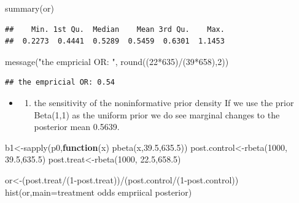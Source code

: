 \documentclass[
]{book}
\newenvironment{Shaded}{\begin{snugshade}}{\end{snugshade}}
\newcommand{\AttributeTok}[1]{\textcolor[rgb]{0.77,0.63,0.00}{#1}}
\newcommand{\ControlFlowTok}[1]{\textcolor[rgb]{0.13,0.29,0.53}{\textbf{#1}}}
\newcommand{\DecValTok}[1]{\textcolor[rgb]{0.00,0.00,0.81}{#1}}
\newcommand{\FloatTok}[1]{\textcolor[rgb]{0.00,0.00,0.81}{#1}}
\newcommand{\FunctionTok}[1]{\textcolor[rgb]{0.00,0.00,0.00}{#1}}
\newcommand{\NormalTok}[1]{#1}
\newcommand{\OtherTok}[1]{\textcolor[rgb]{0.56,0.35,0.01}{#1}}
\newcommand{\SpecialCharTok}[1]{\textcolor[rgb]{0.00,0.00,0.00}{#1}}
\newcommand{\StringTok}[1]{\textcolor[rgb]{0.31,0.60,0.02}{#1}}
\providecommand{\tightlist}{%
  \setlength{\itemsep}{0pt}\setlength{\parskip}{0pt}}
\theoremstyle{definition}
\theoremstyle{definition}
\theoremstyle{definition}
\theoremstyle{definition}
\theoremstyle{remark}
\begin{document}
\begin{Shaded}
\begin{Highlighting}[]
  \FunctionTok{summary}\NormalTok{(or)}
\end{Highlighting}
\end{Shaded}

\begin{verbatim}
##    Min. 1st Qu.  Median    Mean 3rd Qu.    Max. 
##  0.2273  0.4441  0.5289  0.5459  0.6301  1.1453
\end{verbatim}

\begin{Shaded}
\begin{Highlighting}[]
  \FunctionTok{message}\NormalTok{(}\StringTok{"the empricial OR: "}\NormalTok{, }\FunctionTok{round}\NormalTok{((}\DecValTok{22}\SpecialCharTok{*}\DecValTok{635}\NormalTok{)}\SpecialCharTok{/}\NormalTok{(}\DecValTok{39}\SpecialCharTok{*}\DecValTok{658}\NormalTok{),}\DecValTok{2}\NormalTok{))}
\end{Highlighting}
\end{Shaded}

\begin{verbatim}
## the empricial OR: 0.54
\end{verbatim}

\begin{itemize}
\item
  \begin{enumerate}
  \def\labelenumi{(\alph{enumi})}
  \setcounter{enumi}{2}
  \tightlist
  \item
    the sensitivity of the noninformative prior density
    If we use the prior Beta(1,1) as the uniform prior we do see marginal changes to the posterior mean 0.5639.
  \end{enumerate}
\end{itemize}

\begin{Shaded}
\begin{Highlighting}[]
\NormalTok{b1}\OtherTok{\textless{}{-}}\FunctionTok{sapply}\NormalTok{(p0,}\ControlFlowTok{function}\NormalTok{(x) }\FunctionTok{pbeta}\NormalTok{(x,}\FloatTok{39.5}\NormalTok{,}\FloatTok{635.5}\NormalTok{))}
\NormalTok{ post.control}\OtherTok{\textless{}{-}}\FunctionTok{rbeta}\NormalTok{(}\DecValTok{1000}\NormalTok{, }\FloatTok{39.5}\NormalTok{,}\FloatTok{635.5}\NormalTok{)}
\NormalTok{  post.treat}\OtherTok{\textless{}{-}}\FunctionTok{rbeta}\NormalTok{(}\DecValTok{1000}\NormalTok{, }\FloatTok{22.5}\NormalTok{,}\FloatTok{658.5}\NormalTok{)}

\NormalTok{  or}\OtherTok{\textless{}{-}}\NormalTok{(post.treat}\SpecialCharTok{/}\NormalTok{(}\DecValTok{1}\SpecialCharTok{{-}}\NormalTok{post.treat))}\SpecialCharTok{/}\NormalTok{(post.control}\SpecialCharTok{/}\NormalTok{(}\DecValTok{1}\SpecialCharTok{{-}}\NormalTok{post.control))}
  \FunctionTok{hist}\NormalTok{(or,}\AttributeTok{main=}\StringTok{\textquotesingle{}treatment odds empriical posterior\textquotesingle{}}\NormalTok{)}
\end{Highlighting}
\end{Shaded}
\end{document}
